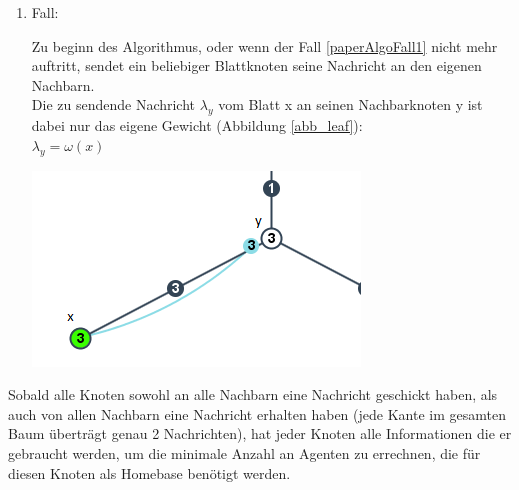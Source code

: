 \begin{enumerate}
\begin{enumerate}
		\end{enumerate}
		
	\item Fall:
		
		\begin{minipage}{0.55\textwidth} 
			Zu beginn des Algorithmus, oder wenn der Fall \ref{paperAlgoFall1} nicht mehr auftritt, sendet ein beliebiger Blattknoten seine Nachricht an den eigenen Nachbarn.\\
			
			Die zu sendende Nachricht $\lambda_{y}$ vom Blatt x an seinen Nachbarknoten y ist dabei nur das eigene Gewicht (Abbildung \ref{abb_leaf}):\\
			$\lambda_{y} = \omega(x)$
		\end{minipage}
		\hfill
		\begin{minipage}{0.35\textwidth}
						
			\includegraphics[width=\textwidth]{bilder/abb_blattknoten.png}
			\label{abb_leaf}
		\end{minipage}
		
\end{enumerate}



Sobald alle Knoten sowohl an alle Nachbarn eine Nachricht geschickt haben, als auch von allen Nachbarn eine Nachricht erhalten haben (jede Kante im gesamten Baum überträgt genau 2 Nachrichten), hat jeder Knoten alle Informationen die er gebraucht werden, um die minimale Anzahl an Agenten zu errechnen, die für diesen Knoten als Homebase benötigt werden.


